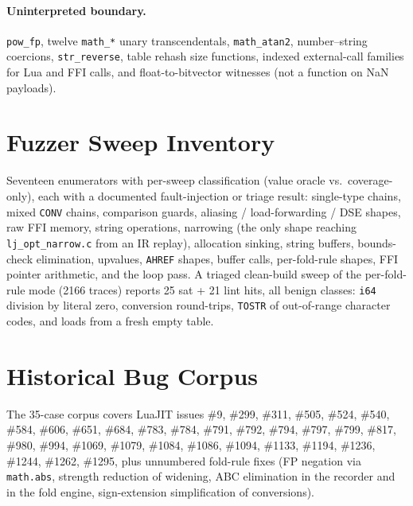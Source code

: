 \documentclass[runningheads]{llncs}
\newcommand{\ir}[1]{\texttt{#1}}
\begin{document}
\paragraph{Uninterpreted boundary.} \texttt{pow\_fp}, twelve
\texttt{math\_*} unary transcendentals, \texttt{math\_atan2},
number--string coercions, \texttt{str\_reverse}, table rehash size
functions, indexed external-call families for Lua and FFI calls, and
float-to-bitvector witnesses (not a function on NaN payloads).

\section{Fuzzer Sweep Inventory}\label{app:sweeps}

Seventeen enumerators with per-sweep classification (value oracle vs.\
coverage-only), each with a documented fault-injection or triage result:
single-type chains, mixed \ir{CONV} chains, comparison guards, aliasing /
load-forwarding / DSE shapes, raw FFI memory, string operations, narrowing
(the only shape reaching \texttt{lj\_opt\_narrow.c} from an IR replay),
allocation sinking, string buffers, bounds-check elimination, upvalues,
\ir{AHREF} shapes, buffer calls, per-fold-rule shapes, FFI pointer
arithmetic, and the loop pass. A triaged clean-build sweep of the
per-fold-rule mode (2166 traces) reports 25 \textsf{sat} + 21 lint hits,
all benign classes: \texttt{i64} division by literal zero, conversion
round-trips, \texttt{TOSTR} of out-of-range character codes, and loads from
a fresh empty table.

\section{Historical Bug Corpus}\label{app:bugs}

The 35-case corpus covers LuaJIT issues
\#9, \#299, \#311, \#505, \#524, \#540, \#584, \#606, \#651, \#684, \#783,
\#784, \#791, \#792, \#794, \#797, \#799, \#817, \#980, \#994, \#1069,
\#1079, \#1084, \#1086, \#1094, \#1133, \#1194, \#1236, \#1244, \#1262,
\#1295, plus unnumbered fold-rule fixes (FP negation via \texttt{math.abs},
strength reduction of widening, ABC elimination in the recorder and in the
fold engine, sign-extension simplification of conversions).
\fi



\end{document}
